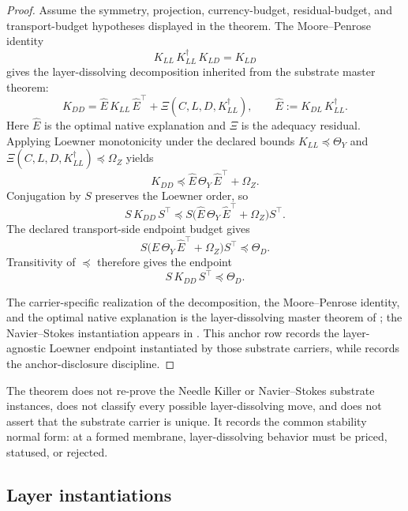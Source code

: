 \documentclass[11pt]{article}
\theoremstyle{definition}
\begin{document}
\begin{proof}
Assume the symmetry, projection, currency-budget, residual-budget,
and transport-budget hypotheses displayed in the theorem.  The
Moore--Penrose identity
\[
  K_{LL}\,K_{LL}^{\dagger}\,K_{LD}=K_{LD}
\]
gives the layer-dissolving decomposition inherited from the
substrate master theorem:
\[
  K_{DD}
  =
  \widehat E\,K_{LL}\,\widehat E^{\!\top}
  +\Xi(C,L,D,K_{LL}^{\dagger}),
  \qquad
  \widehat E:=K_{DL}\,K_{LL}^{\dagger}.
\]
Here \(\widehat E\) is the optimal native explanation and \(\Xi\) is
the adequacy residual.  Applying Loewner monotonicity under the
declared bounds \(K_{LL}\preceq\Theta_Y\) and
\(\Xi(C,L,D,K_{LL}^{\dagger})\preceq\Omega_Z\) yields
\[
  K_{DD}
  \preceq
  \widehat E\,\Theta_Y\,\widehat E^{\!\top}+\Omega_Z .
\]
Conjugation by \(S\) preserves the Loewner order, so
\[
  S\,K_{DD}\,S^{\!\top}
  \preceq
  S\bigl(\widehat E\,\Theta_Y\,\widehat E^{\!\top}
    +\Omega_Z\bigr)S^{\!\top}.
\]
The declared transport-side endpoint budget gives
\[
  S\bigl(\widehat E\,\Theta_Y\,\widehat E^{\!\top}
    +\Omega_Z\bigr)S^{\!\top}
  \preceq \Theta_D .
\]
Transitivity of \(\preceq\) therefore gives the endpoint
\[
  S\,K_{DD}\,S^{\!\top}\preceq\Theta_D .
\]

The carrier-specific realization of the decomposition, the
Moore--Penrose identity, and the optimal native explanation is the
layer-dissolving master theorem of \citet{Tsiokos2026NeedleKiller};
the Navier--Stokes instantiation appears in
\citet{Tsiokos2026NavierStokes}.  This anchor row records
the layer-agnostic Loewner endpoint instantiated by those substrate
carriers, while  records the anchor-disclosure
discipline.
\end{proof}

The theorem does not re-prove the Needle Killer or Navier--Stokes
substrate instances, does not classify every possible
layer-dissolving move, and does not assert that the substrate carrier
is unique.  It records the common stability normal form: at a formed
membrane, layer-dissolving behavior must be priced, statused, or
rejected.

\subsection*{Layer instantiations}\label{layer-inst:F6}
\end{document}
